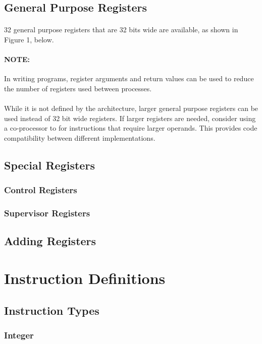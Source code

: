 \documentclass[letterpaper, 11pt]{article}
\begin{document}
\subsection{General Purpose Registers}
\paragraph{}32 general purpose registers that are 32 bits wide are available, as shown in Figure 1, below.
	

\paragraph{NOTE:} In writing programs, register arguments and return values can be used to reduce the number of registers used between processes. 

\paragraph{}While it is not defined by the architecture, larger general purpose registers can be used instead of 32 bit wide registers. If larger registers are needed, consider using a co-processor to for instructions that require larger operands. This provides code compatibility between different implementations.
\subsection{Special Registers}
\subsubsection{Control Registers}
\subsubsection{Supervisor Registers}
\subsection{Adding Registers}


\section{Instruction Definitions}
\subsection{Instruction Types}
\subsubsection{Integer}
\end{document}
